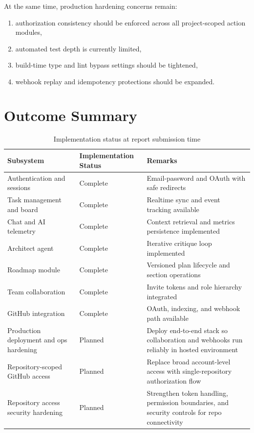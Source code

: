\documentclass[a4paper, 11pt, oneside]{Dissertation}
\begin{document}
At the same time, production hardening concerns remain:
\begin{enumerate}
\item authorization consistency should be enforced across all project-scoped action modules,
\item automated test depth is currently limited,
\item build-time type and lint bypass settings should be tightened,
\item webhook replay and idempotency protections should be expanded.
\end{enumerate}

\section{Outcome Summary}
\begin{table}[H]
\centering
\begin{tabular}{|L{3.6cm}|L{3.2cm}|L{4.1cm}|}
\hline
\textbf{Subsystem} & \textbf{Implementation Status} & \textbf{Remarks} \\
\hline
Authentication and sessions & Complete & Email-password and OAuth with safe redirects \\
\hline
Task management and board & Complete & Realtime sync and event tracking available \\
\hline
Chat and AI telemetry & Complete & Context retrieval and metrics persistence implemented \\
\hline
Architect agent & Complete & Iterative critique loop implemented \\
\hline
Roadmap module & Complete & Versioned plan lifecycle and section operations \\
\hline
Team collaboration & Complete & Invite tokens and role hierarchy integrated \\
\hline
GitHub integration & Complete & OAuth, indexing, and webhook path available \\
\hline
Production deployment and ops hardening & Planned & Deploy end-to-end stack so collaboration and webhooks run reliably in hosted environment \\
\hline
Repository-scoped GitHub access & Planned & Replace broad account-level access with single-repository authorization flow \\
\hline
Repository access security hardening & Planned & Strengthen token handling, permission boundaries, and security controls for repo connectivity \\
\hline
\end{tabular}
\caption{Implementation status at report submission time}
\label{tab:status-summary}
\end{table}
\end{document}
